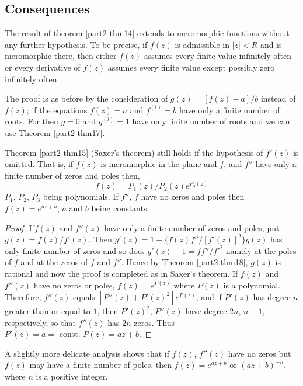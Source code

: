 \subsection{Consequences}\label{part2-sec2.7}

\begin{thm}\label{part2-thm18}
The result of theorem \ref{part2-thm14} extends to meromorphic
functions without any further hypothesis. To be precise, if $f(z)$ is
admissible in $|z|<R$ and is meromorphic there, then either $f(z)$
assumes every finite value infinitely often or every derivative of
$f(z)$ assumes every finite value except possibly zero infinitely often.
\end{thm}

The proof is as before by the consideration of $g(z)=[f(z)-a]/b$
instead of $f(z)$; if the equations $f(z)=a$ and $f^{(l)}=b$ have only
a finite number of roots. For then $g=0$ and $g^{(l)}=1$ have only
finite number of roots and we can use Theorem \ref{part2-thm17}.

\begin{thm}\label{part2-thm19}
Theorem \ref{part2-thm15} (Saxer's theorem) still holds if the
hypothesis of $f'(z)$ is omitted. That is, if $f(z)$ is meromorphic in
the plane and $f$, and $f''$ have only a finite number of zeros and
poles then,
$$
f(z)=P_{1}(z)/P_{2}(z)e^{P_{3}(z)}
$$
$P_{1}$, $P_{2}$, $P_{3}$ being polynomials. If $f''$, $f$ have no
zeros and poles then $f(z)=e^{az+b}$, $a$ and $b$ being constants.
\end{thm}

\begin{proof}
If\pageoriginale $f(z)$ and $f''(z)$ have only a finite number of
zeros and poles, put $g(z)=f(z)/f'(z)$. Then
$g'(z)=1-\{f(z)f''/[f'(z)]^{2}\}g(z)$ has only finite number of zeros
and so does $g'(z)-1=ff''/{f'}^{2}$ namely at the poles of $f$ and at
the zeros of $f$ and $f''$. Hence by Theorem \ref{part2-thm18}, $g(z)$
is rational and now the proof is completed as in Saxer's theorem. If
$f(z)$ and $f''(z)$ have no zeros or poles, $f(z)=e^{P(z)}$ where
$P(z)$ is a polynomial. Therefore, $f''(z)$ equals
$[P''(z)+P'(z)^{2}]e^{P(z)}$, and if $P'(z)$ has degree $n$ greater
than or equal to $1$, then $P'(z)^{2}$, $P''(z)$ have degree $2n$,
$n-1$, respectively, so that $f''(z)$ has $2n$ zeros. Thus
$P'(z)=a=\text{ const. } P(z)=az+b$.  
\end{proof}

A slightly more delicate analysis shows that if $f(z)$, $f''(z)$ have
no zeros but $f(z)$ may have a finite number of poles, then
$f(z)=e^{az+b}$ or $(az+b)^{-n}$, where $n$ is a positive integer.
